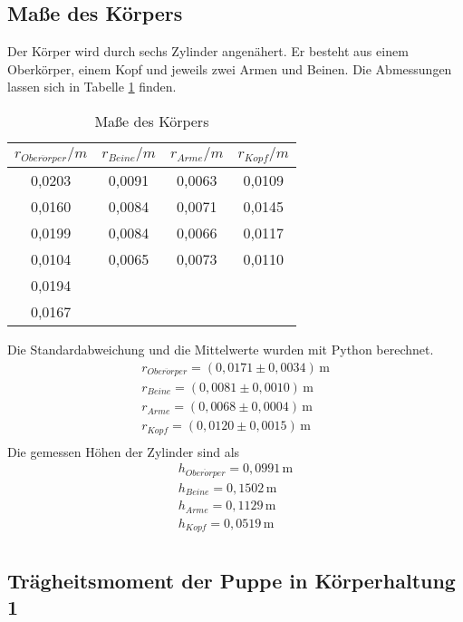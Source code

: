 \subsection{Maße des Körpers}
\label{sec:maskoerper}
Der Körper wird durch sechs Zylinder angenähert. Er besteht aus einem Oberkörper, einem Kopf und jeweils zwei Armen und Beinen.
Die Abmessungen lassen sich in Tabelle \ref{tab:r_Koerper} finden.
\begin{table}
  \centering
  \caption{Maße des Körpers}
  \label{tab:r_Koerper}
  \begin{tabular}{c c c c}
    \toprule
    $r_{Ober\ddot{o}rper}/m$ & $r_{Beine}/m$ & $r_{Arme}/m$ & $r_{Kopf}/m$ \\
    \midrule
    0,0203 &  0,0091 &  0,0063 & 0,0109 \\
    0,0160 &  0,0084 &  0,0071 & 0,0145 \\
    0,0199 &  0,0084 &  0,0066 & 0,0117 \\
    0,0104 &  0,0065 &  0,0073 & 0,0110 \\
    0,0194 &         &         &        \\
    0,0167 &         &         &        \\
    \bottomrule
  \end{tabular}
\end{table}
Die Standardabweichung und die Mittelwerte wurden mit Python berechnet.
\begin{align*}
  r_{Ober\ddot{o}rper}       = (0{,}0171 \pm 0{,}0034)\, \mathrm{m} \\
  r_{Beine}      = (0{,}0081 \pm 0{,}0010)\, \mathrm{m} \\
  r_{Arme}       = (0{,}0068 \pm 0{,}0004)\, \mathrm{m} \\
  r_{Kopf}       = (0{,}0120 \pm 0{,}0015)\, \mathrm{m} \\
\end{align*}
Die gemessen Höhen der Zylinder sind als
\begin{align*}
  h_{Ober\ddot{o}rper}       = 0{,}0991 \, \mathrm{m} \\
  h_{Beine}      = 0{,}1502 \, \mathrm{m} \\
  h_{Arme}       = 0{,}1129 \, \mathrm{m} \\
  h_{Kopf}       = 0{,}0519 \, \mathrm{m} \\
\end{align*}


\subsection{Trägheitsmoment der Puppe in Körperhaltung 1}
\label{sec:TraegheitsmomentderPuppeinKoerperhaltung 1}
